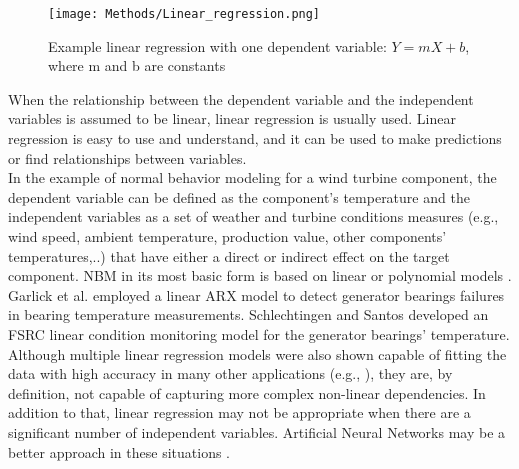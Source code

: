     \begin{figure}[H]
      \begin{center}
        \texttt{[image: Methods/Linear\_regression.png]}
      \end{center}
      \caption{Example linear regression with one dependent variable: $Y = mX + b$, where m and b are constants}
      \label{fig:linear_regression}
  \end{figure}

    When the relationship between the dependent variable and the independent variables is assumed to be linear, 
    linear regression is usually used. Linear regression is easy to use and understand, and it can be used to make predictions or find relationships between variables.\\
    In the example of normal behavior modeling for a wind turbine component, the dependent variable can be defined as the component's temperature 
    and the independent variables as a set of weather and turbine conditions measures (e.g., wind speed, ambient temperature, production value, other components' temperatures,..) 
    that have either a direct or indirect effect on the target component.
    NBM in its most basic form is based on linear or polynomial models \cite{SCADA_NBM_Review}. 
    Garlick et al. \cite{Garlick} employed a linear ARX model to detect generator bearings failures in bearing temperature measurements.
    Schlechtingen and Santos \cite{Schlechtingen} developed an FSRC linear condition monitoring model for the generator bearings' temperature.\\
    Although multiple linear regression models were also shown capable of fitting the data with high accuracy in many other applications (e.g., \cite{Linear_Regression_Example_1}), 
    they are, by definition, not capable of capturing more complex non-linear dependencies. In addition to that, linear regression may not be appropriate when there are a significant 
    number of independent variables. Artificial Neural Networks may be a better approach in these situations \cite{LNR_vs_ANN}.



